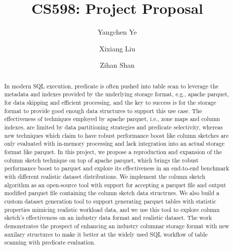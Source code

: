 \documentclass[sigconf, nonacm]{acmart}
\begin{document}
\title{CS598: Project Proposal}

\author{Yangchen Ye}

\author{Xixiang Liu}

\author{Zihan Shan}

\begin{abstract}

In modern SQL execution, predicate is often pushed into table scan to leverage the metadata and indexes provided by the underlying storage format, e.g., apache parquet, for data skipping and efficient processing, and the key to success is for the storage format to provide good enough data structures to support this use case.
The effectiveness of techniques employed by apache parquet, i.e., zone maps and column indexes, are limited by data partitioning strategies and predicate selectivity, whereas new techniques which claim to have robust performance boost like column sketches are only evaluated with in-memory processing and lack integration into an actual storage format like parquet.
In this project, we propose a reproduction and expansion of the column sketch technique on top of apache parquet, which brings the robust performance boost to parquet and explore its effectiveness in an end-to-end benchmark with different realistic dataset distributions.
We implement the column sketch algorithm as an open-source tool with support for accepting a parquet file and output modified parquet file containing the column sketch data structrues.
We also build a custom dataset generation tool to support generating parquet tables with statistic properties mimicing realistic workload data, and we use this tool to explore column sketch's effectiveness on an industry data format and realistic dataset.
The work demonstrates the prospect of enhancing an industry columnar storage format with new auxilary structures to make it better at the widely used SQL workflow of table scanning with predicate evaluation.

\end{abstract}

\maketitle




% 





\end{document}
